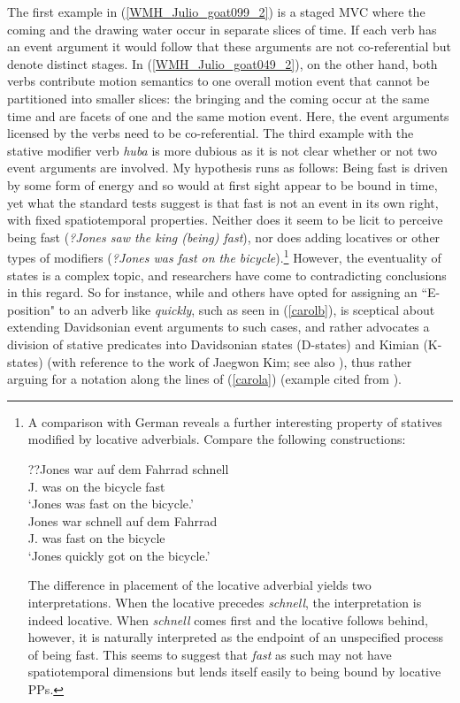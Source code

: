 The first example in (\ref{WMH_Julio_goat099_2}) is a staged MVC where the coming and the drawing water occur in separate slices of time. If each verb has an event argument it would follow that these arguments are not co-referential but denote distinct stages. In (\ref{WMH_Julio_goat049_2}), on the other hand, both verbs contribute motion semantics to one overall motion event that cannot be partitioned into smaller slices: the bringing and the coming occur at the same time and are facets of one and the same motion event. Here, the event arguments licensed by the verbs need to be co-referential. The third example with the stative modifier verb \textit{huba} is more dubious as it is not clear whether or not two event arguments are involved. My hypothesis runs as follows: Being fast is driven by some form of energy and so would at first sight appear to be bound in time, yet what the standard tests suggest is that fast is not an event in its own right, with fixed spatiotemporal properties. Neither does it seem to be licit to perceive being fast (\textit{?Jones saw the king (being) fast}), nor does adding locatives or other types of modifiers (\textit{?Jones was fast on the bicycle}).\footnote{A comparison with German reveals a further interesting property of statives modified by locative adverbials. Compare the following constructions:

\ea 
\ea
\gll ??Jones war auf dem Fahrrad schnell\\
J. was on the bicycle fast \\
\glft `Jones was fast on the bicycle.'\\
\ex
\gll Jones war schnell auf dem Fahrrad\\
J. was fast on the bicycle \\
\glft `Jones quickly got on the bicycle.'\\
\z
\z

The difference in placement of the locative adverbial yields two interpretations. When the locative precedes \textit{schnell}, the interpretation is indeed locative. When \textit{schnell} comes first and the locative follows behind, however, it is naturally interpreted as the endpoint of an unspecified process of being fast. This seems to suggest that \textit{fast} as such may not have spatiotemporal dimensions but lends itself easily to being bound by locative PPs.} However, the eventuality of states is a complex topic, and researchers have come to contradicting conclusions in this regard. So for instance, while \citet[355f.]{higginbotham2000events} and others have opted for assigning an ``E-position" to an adverb like \textit{quickly}, such as seen in (\ref{carolb}), \citet{maienborn2005limits} is sceptical about extending Davidsonian event arguments to such cases, and rather advocates a division of stative predicates into Davidsonian states (D-states) and Kimian (K-states) (with reference to the work of Jaegwon Kim; see also \citealt{engelberg2005kimian}), thus rather arguing for a notation along the lines of (\ref{carola}) (example cited from \citealt[312]{maienborn2005limits}).


